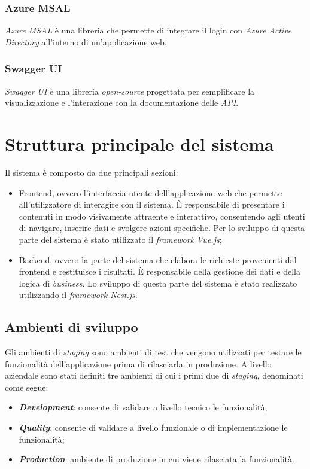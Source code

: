 \subsubsection{Azure MSAL}\label{subsubsec:azure-MSAL}
\textit{Azure MSAL} è una libreria che permette di integrare il login con \textit{Azure Active Directory} all'interno di un'applicazione web.
\subsubsection{Swagger UI}\label{subsubsec:swagger-ui}
\textit{Swagger UI} è una libreria \textit{open-source} progettata per semplificare la visualizzazione e l'interazione con la documentazione delle \textit{API}.

\section{Struttura principale del sistema}
Il sistema è composto da due principali sezioni:
\begin{itemize}
  \item Frontend, ovvero l'interfaccia utente dell'applicazione web che permette all'utilizzatore di interagire con il sistema. È responsabile di presentare i contenuti in modo visivamente attraente e interattivo, consentendo agli utenti di navigare, inserire dati e svolgere azioni specifiche. Per lo
  sviluppo di questa parte del sistema è stato utilizzato il \textit{framework Vue.js};
  \item Backend, ovvero la parte del sistema che elabora le richieste provenienti dal frontend e restituisce i risultati. È responsabile della gestione dei dati e della logica di \textit{business}.
  Lo sviluppo di questa parte del sistema è stato realizzato utilizzando il \textit{framework Nest.js}. 
\end{itemize}

\subsection{Ambienti di sviluppo}
Gli ambienti di \textit{staging} sono ambienti di test che vengono utilizzati per testare le funzionalità dell'applicazione prima di rilasciarla in produzione.
A livello aziendale sono stati definiti tre ambienti di cui i primi due di \textit{staging}, denominati come segue:
\begin{itemize}
  \item \textbf{\textit{Development}}: consente di validare a livello tecnico le funzionalità;
  \item \textbf{\textit{Quality}}: consente di validare a livello funzionale o di implementazione le funzionalità;
  \item \textbf{\textit{Production}}: ambiente di produzione in cui viene rilasciata la funzionalità.
\end{itemize}

